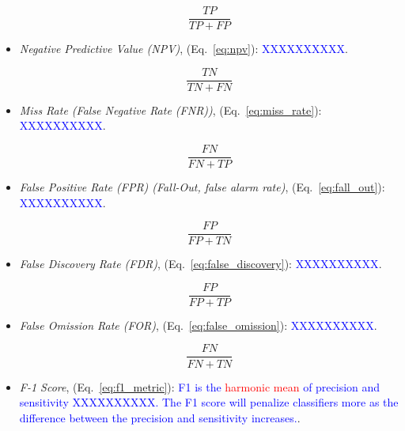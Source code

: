 \begin{itemize}[noitemsep,topsep=0pt]
\begin{equation}
{\frac{TP}{TP+FP}}
\label{eq:precision}
\end{equation}

\item \textit{Negative Predictive Value (NPV)}, (Eq.~\ref{eq:npv}): \textcolor{blue}{XXXXXXXXXX}.

\begin{equation}
{\frac{TN}{TN+FN}}
\label{eq:npv}
\end{equation}

\item \textit{Miss Rate (False Negative Rate (FNR))}, (Eq.~\ref{eq:miss_rate}): \textcolor{blue}{XXXXXXXXXX}.

\begin{equation}
{\frac{FN}{FN+TP}}
\label{eq:miss_rate}
\end{equation}

\item \textit{False Positive Rate (FPR) (Fall-Out, false alarm rate)}, (Eq.~\ref{eq:fall_out}): \textcolor{blue}{XXXXXXXXXX}.

\begin{equation}
{\frac{FP}{FP+TN}}
\label{eq:fall_out}
\end{equation}

\item \textit{False Discovery Rate (FDR)}, (Eq.~\ref{eq:false_discovery}): \textcolor{blue}{XXXXXXXXXX}.

\begin{equation}
{\frac{FP}{FP+TP}}
\label{eq:false_discovery}
\end{equation}

\item \textit{False Omission Rate (FOR)}, (Eq.~\ref{eq:false_omission}): \textcolor{blue}{XXXXXXXXXX}.

\begin{equation}
{\frac{FN}{FN+TN}}
\label{eq:false_omission}
\end{equation}

\item \textit{F-1 Score}, (Eq.~\ref{eq:f1_metric}): \textcolor{blue}{F1 is the \textcolor{red}{harmonic mean} of precision and sensitivity XXXXXXXXXX. The F1 score will penalize classifiers more as the difference between the precision and sensitivity increases.}.


\end{itemize}
